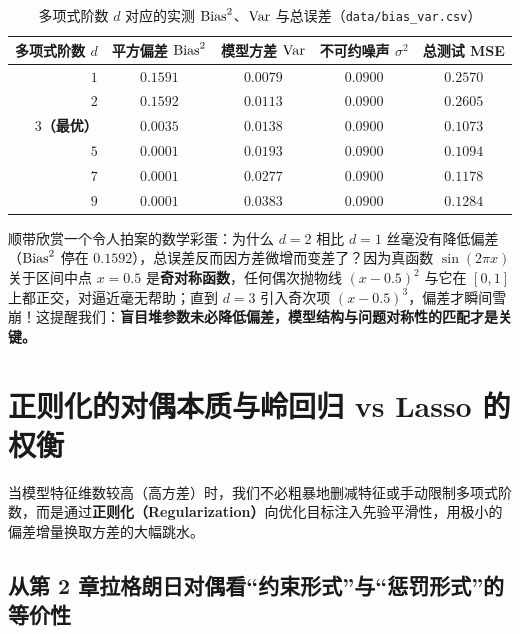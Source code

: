 \begin{table}[htbp]
\centering
\caption{多项式阶数 $d$ 对应的实测 $\operatorname{Bias}^2$、$\operatorname{Var}$ 与总误差（\texttt{data/bias\_var.csv}）}\label{tab:v4-ch3-bv}
\small
\begin{tabular}{@{}rcccc@{}}
\toprule
\textbf{多项式阶数 $d$} & \textbf{平方偏差 $\operatorname{Bias}^2$} & \textbf{模型方差 $\operatorname{Var}$} & \textbf{不可约噪声 $\sigma^2$} & \textbf{总测试 MSE} \\
\midrule
$1$ & $0.1591$ & $0.0079$ & $0.0900$ & $0.2570$ \\
$2$ & $0.1592$ & $0.0113$ & $0.0900$ & $0.2605$ \\
\textbf{$3$（最优）} & $\mathbf{0.0035}$ & $\mathbf{0.0138}$ & $0.0900$ & $\mathbf{0.1073}$ \\
$5$ & $0.0001$ & $0.0193$ & $0.0900$ & $0.1094$ \\
$7$ & $0.0001$ & $0.0277$ & $0.0900$ & $0.1178$ \\
$9$ & $0.0001$ & $0.0383$ & $0.0900$ & $0.1284$ \\
\bottomrule
\end{tabular}
\end{table}

顺带欣赏一个令人拍案的数学彩蛋：为什么 $d=2$ 相比 $d=1$ 丝毫没有降低偏差（$\operatorname{Bias}^2$ 停在 $0.1592$），总误差反而因方差微增而变差了？因为真函数 $\sin(2\pi x)$ 关于区间中点 $x = 0.5$ 是\textbf{奇对称函数}，任何偶次抛物线 $(x-0.5)^2$ 与它在 $[0, 1]$ 上都正交，对逼近毫无帮助；直到 $d=3$ 引入奇次项 $(x-0.5)^3$，偏差才瞬间雪崩！这提醒我们：\textbf{盲目堆参数未必降低偏差，模型结构与问题对称性的匹配才是关键。}

\section{正则化的对偶本质与岭回归 vs Lasso 的权衡}

当模型特征维数较高（高方差）时，我们不必粗暴地删减特征或手动限制多项式阶数，而是通过\textbf{正则化（Regularization）}向优化目标注入先验平滑性，用极小的偏差增量换取方差的大幅跳水。

\subsection{从第 2 章拉格朗日对偶看“约束形式”与“惩罚形式”的等价性}

